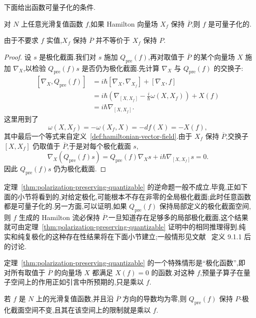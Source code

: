 下面给出函数可量子化的条件.

\begin{theorem}
\label{thm:polarization-preserving-quantizable}
对 $N$ 上任意光滑复值函数 $f$,如果 Hamilton 向量场 $X_f$ 保持 $\overline P$,则 $f$ 是可量子化的.
\end{theorem}

由于不要求 $f$ 实值,$X_f$ 保持 $\overline P$ 并不等价于 $X_f$ 保持 $P$.

\begin{proof}
设 $s$ 是极化截面.我们对 $s$ 施加 $Q_{\mathrm{pre}}(f)$,再对取值于 $\overline P$ 的某个向量场 $X$ 施加 $\nabla_X$,以检验 $Q_{\mathrm{pre}}(f)s$ 是否仍为极化截面.先计算 $\nabla_X$ 与 $Q_{\mathrm{pre}}(f)$ 的交换子:
\[
\begin{aligned}
\left[\nabla_X,Q_{\mathrm{pre}}(f)\right]
 &=i\hbar[\nabla_X,\nabla_{X_f}]+[\nabla_X,f]\\
 &=i\hbar\left(\nabla_{[X,X_f]}-\frac{i}{\hbar}\omega(X,X_f)\right)+X(f)\\
 &=i\hbar\nabla_{[X,X_f]}.
 \label{eq:polarization-commutator}
\end{aligned}
\]
这里用到了
\[
 \omega(X,X_f)=-\omega(X_f,X)=-df(X)=-X(f),
\]
其中最后一个等式来自定义~\ref{def:hamiltonian-vector-field}.由于 $X_f$ 保持 $\overline P$,交换子 $[X,X_f]$ 仍取值于 $\overline P$,于是对每个极化截面 $s$,
\[
 \nabla_X(Q_{\mathrm{pre}}(f)s)
 =Q_{\mathrm{pre}}(f)\nabla_Xs+i\hbar\nabla_{[X,X_f]}s=0.
\]
因此 $Q_{\mathrm{pre}}(f)s$ 仍为极化截面.
\end{proof}

定理~\ref{thm:polarization-preserving-quantizable} 的逆命题一般不成立.毕竟,正如下面的小节将看到的,对给定极化,可能根本不存在非零的全局极化截面;此时任意函数都是可量子化的.另一方面,可以证明,如果 $Q_{\mathrm{pre}}(f)$ 保持局部定义的极化截面空间,则 $f$ 生成的 Hamilton 流必保持 $\overline P$.一旦知道存在足够多的局部极化截面,这个结果就可由定理~\ref{thm:polarization-preserving-quantizable} 证明中的相同推理得到.纯实和纯复极化的这种存在性结果将在下面小节建立;一般情形见文献~\cite{Woodhouse1992} 定义 9.1.1 后的讨论.

定理~\ref{thm:polarization-preserving-quantizable} 的一个特殊情形是“极化函数”,即对所有取值于 $\overline P$ 的向量场 $X$ 都满足 $X(f)=0$ 的函数.对这种 $f$,预量子算子在量子空间上的作用正如引言中所预期的,只是乘以 $f$.

\begin{proposition}[极化函数的量子化]
\label{prop:polarized-observable}
若 $f$ 是 $N$ 上的光滑复值函数,并且沿 $\overline P$ 方向的导数均为零,则 $Q_{\mathrm{pre}}(f)$ 保持 $P$-极化截面空间不变,且其在该空间上的限制就是乘以 $f$.
\end{proposition}


